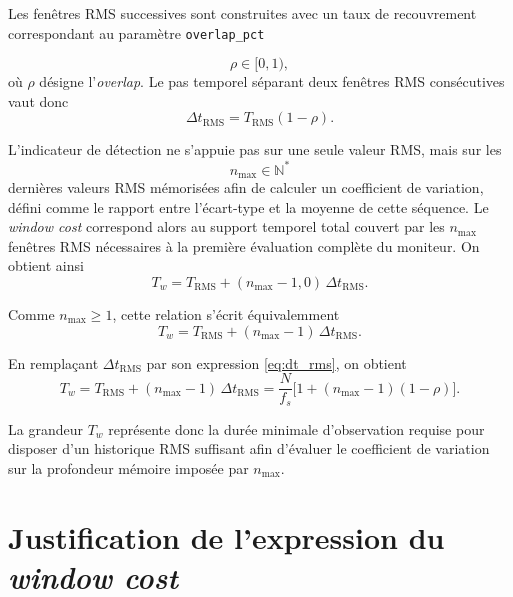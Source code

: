 \documentclass[12pt,a4paper, openany]{book}
\begin{document}
Les fenêtres RMS successives sont construites avec un taux de recouvrement correspondant au paramètre \texttt{overlap\_pct}

\begin{equation}
\rho \in [0,1),
\end{equation}
où $\rho$ désigne l'\textit{overlap}. Le pas temporel séparant deux fenêtres RMS consécutives vaut donc
\begin{equation}
\Delta t_{\mathrm{RMS}} = T_{\mathrm{RMS}}(1-\rho).
\label{eq:dt_rms}
\end{equation}

L'indicateur de détection ne s'appuie pas sur une seule valeur RMS, mais sur les
\begin{equation}
n_{\max} \in \mathbb{N}^{*}
\end{equation}
dernières valeurs RMS mémorisées afin de calculer un coefficient de variation, défini comme le rapport entre l'écart-type et la moyenne de cette séquence. Le \textit{window cost} correspond alors au support temporel total couvert par les $n_{\max}$ fenêtres RMS nécessaires à la première évaluation complète du moniteur. On obtient ainsi
\begin{equation}
T_w = T_{\mathrm{RMS}} + (n_{\max}-1,0)\,\Delta t_{\mathrm{RMS}}.
\label{eq:tw_rms_cv_general}
\end{equation}

Comme $n_{\max}\geq 1$, cette relation s'écrit équivalemment
\begin{equation}
T_w = T_{\mathrm{RMS}} + (n_{\max}-1)\,\Delta t_{\mathrm{RMS}}.
\label{eq:tw_rms_cv}
\end{equation}

En remplaçant $\Delta t_{\mathrm{RMS}}$ par son expression \eqref{eq:dt_rms}, on obtient
\begin{equation}
T_w = T_{\mathrm{RMS}} + (n_{\max}-1)\,\Delta t_{\mathrm{RMS}} = 
\frac{N}{f_s}
\bigl[1+(n_{\max}-1)(1-\rho)\bigr].
\label{eq:rms_window_cost}
\end{equation}

La grandeur $T_w$ représente donc la durée minimale d'observation requise pour disposer d'un historique RMS suffisant afin d'évaluer le coefficient de variation sur la profondeur mémoire imposée par $n_{\max}$.

\section{Justification de l'expression du \textit{window cost}}
\end{document}
